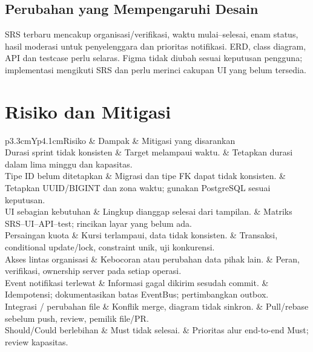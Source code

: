 \documentclass[11pt,a4paper]{article}
\newcommand{\tbl}[2]{\par\smallskip\noindent\begin{tabularx}{\linewidth}{#1}\toprule #2\bottomrule\end{tabularx}\par\smallskip}
\newcommand{\page}[1]{\clearpage\section{#1}}
\begin{document}
\subsection{Perubahan yang Mempengaruhi Desain}
SRS terbaru mencakup organisasi/verifikasi, waktu mulai--selesai, enam status, hasil moderasi untuk penyelenggara dan prioritas notifikasi. ERD, class diagram, API dan testcase perlu selaras. Figma tidak diubah sesuai keputusan pengguna; implementasi mengikuti SRS dan perlu merinci cakupan UI yang belum tersedia.
\page{Risiko dan Mitigasi}
\tbl{p{3.3cm}Yp{4.1cm}}{Risiko & Dampak & Mitigasi yang disarankan\\\midrule
Durasi sprint tidak konsisten & Target melampaui waktu. & Tetapkan durasi dalam lima minggu dan kapasitas.\\
Tipe ID belum ditetapkan & Migrasi dan tipe FK dapat tidak konsisten. & Tetapkan UUID/BIGINT dan zona waktu; gunakan PostgreSQL sesuai keputusan.\\
UI sebagian kebutuhan & Lingkup dianggap selesai dari tampilan. & Matriks SRS--UI--API--test; rincikan layar yang belum ada.\\
Persaingan kuota & Kursi terlampaui, data tidak konsisten. & Transaksi, conditional update/lock, constraint unik, uji konkurensi.\\
Akses lintas organisasi & Kebocoran atau perubahan data pihak lain. & Peran, verifikasi, ownership server pada setiap operasi.\\
Event notifikasi terlewat & Informasi gagal dikirim sesudah commit. & Idempotensi; dokumentasikan batas EventBus; pertimbangkan outbox.\\
Integrasi / perubahan file & Konflik merge, diagram tidak sinkron. & Pull/rebase sebelum push, review, pemilik file/PR.\\
Should/Could berlebihan & Must tidak selesai. & Prioritas alur end-to-end Must; review kapasitas.\\}
\end{document}
